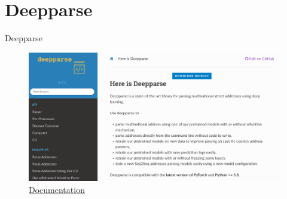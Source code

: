 \documentclass{beamer}
\begin{document}
	
	\section{Deepparse}
	
	\begin{frame}{Deepparse}
		\begin{figure}
			\centering
			\includegraphics[width=\linewidth]{img/deepparse}
			\caption{\href{https://deepparse.org/index.html}{Documentation}}
		\end{figure}
	\end{frame}
	
\end{document}
